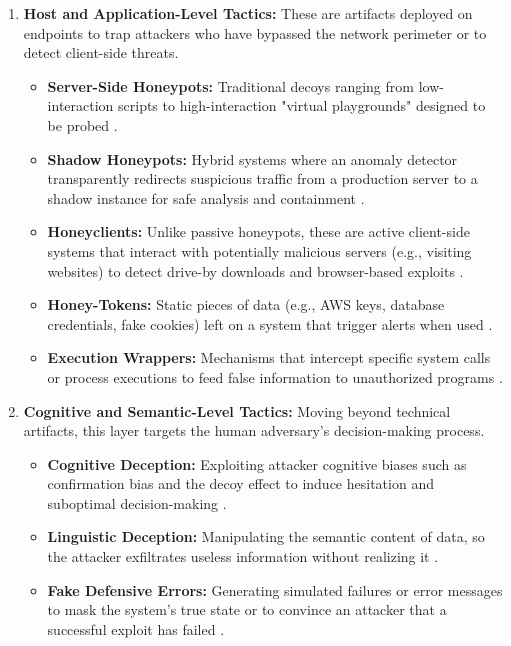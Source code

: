 \begin{enumerate}
      \item \textbf{Host and Application-Level Tactics:}
            These are artifacts deployed on endpoints to trap attackers who have bypassed the network perimeter or to detect
            client-side threats.
            \begin{itemize}
                  \item \textbf{Server-Side Honeypots:} Traditional decoys ranging from low-interaction scripts to high-interaction
                        "virtual playgrounds" designed to be probed \cite{spitzner2002honeypots}.
                  \item \textbf{Shadow Honeypots:} Hybrid systems where an anomaly detector transparently redirects suspicious
                        traffic from a production server to a shadow instance for safe analysis and containment \cite{nawrocki2016survey}.
                  \item \textbf{Honeyclients:} Unlike passive honeypots, these are active client-side systems that interact
                        with potentially malicious servers (e.g., visiting websites) to detect drive-by downloads and browser-based
                        exploits \cite{nawrocki2016survey}.
                  \item \textbf{Honey-Tokens:} Static pieces of data (e.g., AWS keys, database credentials, fake cookies)
                        left on a system that trigger alerts when used \cite{nawrocki2016survey}.
                  \item \textbf{Execution Wrappers:} Mechanisms that intercept specific system calls or process executions
                        to feed false information to unauthorized programs \cite{cohen2006use}.
            \end{itemize}

      \item \textbf{Cognitive and Semantic-Level Tactics:}
            Moving beyond technical artifacts, this layer targets the human adversary's decision-making process.
            \begin{itemize}
                  \item \textbf{Cognitive Deception:} Exploiting attacker cognitive biases such as confirmation bias and
                        the decoy effect to induce hesitation and suboptimal decision-making \cite{ferguson2021examining}.
                  \item \textbf{Linguistic Deception:} Manipulating the semantic content of data, so the attacker exfiltrates
                        useless information without realizing it \cite{rowe2016introduction}.
                  \item \textbf{Fake Defensive Errors:} Generating simulated failures or error messages to mask the
                        system's true state or to convince an attacker that a successful exploit has failed \cite{rowe2016introduction}.
            \end{itemize}
\end{enumerate}


